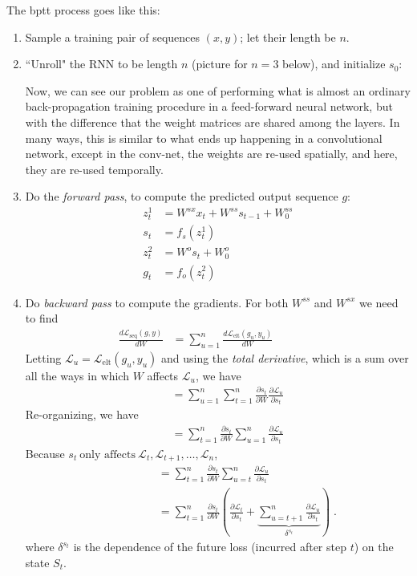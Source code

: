 \noindent The {\sc bptt} process goes like this:
\begin{enumerate}[(1)]
\item
Sample a training pair of  sequences $(x, y)$; let their length be $n$.
\item
``Unroll" the RNN to be length $n$ (picture for $n = 3$ below), and
initialize $s_0$:

Now,  we can see our problem as one of performing what is almost an
ordinary back-propagation training procedure in a feed-forward neural
network, but with the difference that the weight matrices are shared
among the layers.  In many ways, this is similar to what ends up
happening in a convolutional network, except in the conv-net, the
weights are re-used spatially, and here, they are re-used temporally.
\item
Do the {\it forward pass}, to compute the predicted output sequence $g$:
\begin{align}
z_t^1 &= W^{sx}x_t + W^{ss}s_{t - 1} + W^{ss}_0\\
s_t &= f_s(z_t^1)\\
z_t^2 &= W^os_t + W_0^o\\
g_t &= f_o(z_t^2)
\end{align}
\item
Do {\em backward pass} to compute the gradients. For both $W^{ss}$ and
$W^{sx}$ we need to find
\begin{align}
\frac{d \mathcal{L}_\text{seq}(g,y)}{d W} &= \sum_{u = 1}^n\frac{d \mathcal{L}_\text{elt}(g_u, y_u)}{d W} ~~~~~~~~~~~~~~~~~~ \nonumber
\end{align}
Letting $\mathcal{L}_u = \mathcal{L}_\text{elt}(g_u, y_u)$ and using the {\em  total derivative}, which is a sum over all
the ways in which $W$ affects $\mathcal{L}_u$, we have
\begin{align}
~~~~ &= \sum_{u = 1}^n\sum_{t = 1}^n  \frac{\partial s_t}{\partial W} \frac{\partial \mathcal{L}_u}{\partial s_t}  \nonumber
\end{align}
Re-organizing, we have
\begin{align}
~~~~ &= \sum_{t = 1}^n\frac{\partial s_t}{\partial W} \sum_{u =
  1}^n\frac{\partial \mathcal{L}_u}{\partial s_t} \nonumber
\end{align}
Because $s_t\ \text{only affects}\ \mathcal{L}_t, \mathcal{L}_{t + 1}, \dots, \mathcal{L}_n$, 
\begin{align}
~~~~~~~~~~~~~~~~~~~~ &= \sum_{t = 1}^n\frac{\partial s_t}{\partial W} \sum_{u = t}^n\frac{\partial \mathcal{L}_u}{\partial s_t} \nonumber\\
&= \sum_{t = 1}^n\frac{\partial s_t}{\partial W} 
  \left(\frac{\partial \mathcal{L}_t}{\partial s_t} + \underbrace{\sum_{u = t +
  1}^n\frac{\partial \mathcal{L}_u}{\partial s_t}}_{\delta^{s_t}}\right) \; .\label{sumeq}
\end{align}
where $\delta^{s_t}$ is the dependence of the future loss (incurred after step $t$) on the
state $S_t$.


\end{enumerate}
